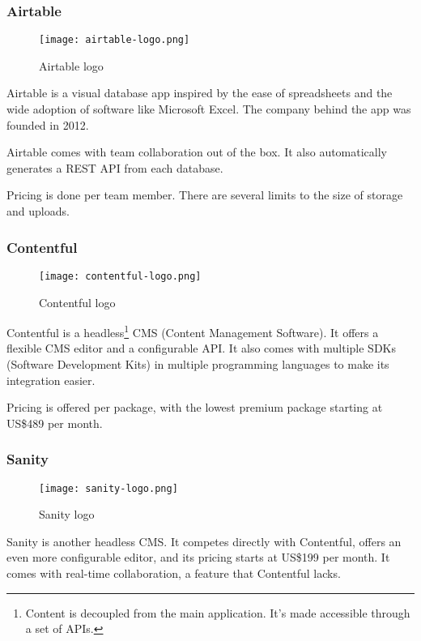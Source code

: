 \subsubsection{Airtable}

\begin{figure}[h]
	\centering
	\texttt{[image: airtable-logo.png]}
	\caption{Airtable logo}
\end{figure}

Airtable is a visual database app inspired by the ease of spreadsheets
and the wide adoption of software like Microsoft Excel. The company
behind the app was founded in 2012.

Airtable comes with team collaboration out of the box. It also
automatically generates a REST API from each database.

Pricing is done per team member. There are several limits to the size of
storage and uploads.

\subsubsection{Contentful}

\begin{figure}[h]
	\centering
	\texttt{[image: contentful-logo.png]}
	\caption{Contentful logo}
\end{figure}

Contentful is a headless\footnote{Content is decoupled from the main
	application. It's made accessible through a set of APIs.} CMS (Content
Management Software). It offers a flexible CMS editor and a configurable
API. It also comes with multiple SDKs (Software Development Kits) in
multiple programming languages to make its integration easier.

Pricing is offered per package, with the lowest premium package starting
at US\$489 per month.

\subsubsection{Sanity}

\begin{figure}[h]
	\centering
	\texttt{[image: sanity-logo.png]}
	\caption{Sanity logo}
\end{figure}

Sanity is another headless CMS. It competes directly with Contentful,
offers an even more configurable editor, and its pricing starts at
US\$199 per month. It comes with real-time collaboration, a feature that
Contentful lacks.

